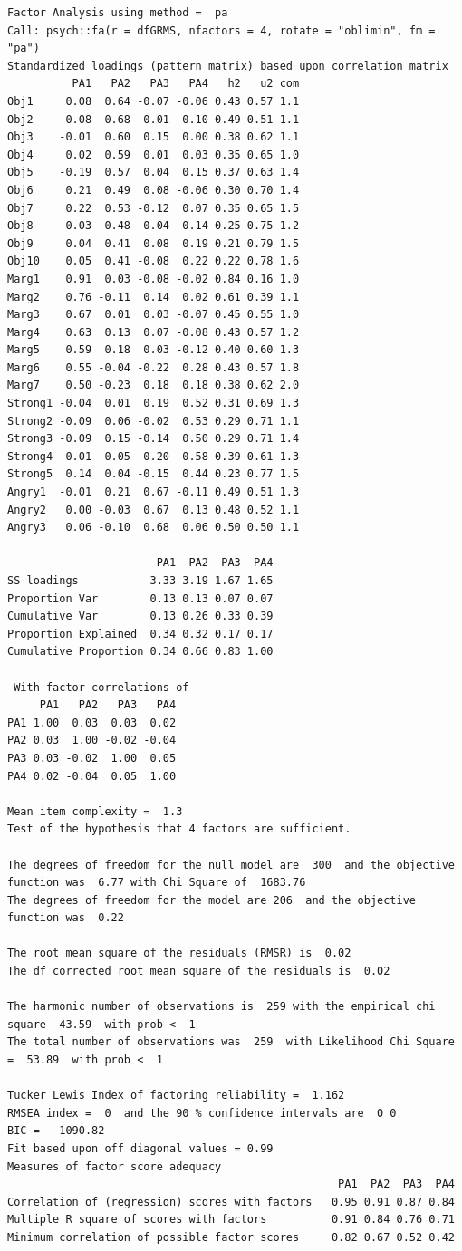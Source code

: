 \documentclass[
  english,
]{book}
\begin{document}
\begin{verbatim}
Factor Analysis using method =  pa
Call: psych::fa(r = dfGRMS, nfactors = 4, rotate = "oblimin", fm = "pa")
Standardized loadings (pattern matrix) based upon correlation matrix
          PA1   PA2   PA3   PA4   h2   u2 com
Obj1     0.08  0.64 -0.07 -0.06 0.43 0.57 1.1
Obj2    -0.08  0.68  0.01 -0.10 0.49 0.51 1.1
Obj3    -0.01  0.60  0.15  0.00 0.38 0.62 1.1
Obj4     0.02  0.59  0.01  0.03 0.35 0.65 1.0
Obj5    -0.19  0.57  0.04  0.15 0.37 0.63 1.4
Obj6     0.21  0.49  0.08 -0.06 0.30 0.70 1.4
Obj7     0.22  0.53 -0.12  0.07 0.35 0.65 1.5
Obj8    -0.03  0.48 -0.04  0.14 0.25 0.75 1.2
Obj9     0.04  0.41  0.08  0.19 0.21 0.79 1.5
Obj10    0.05  0.41 -0.08  0.22 0.22 0.78 1.6
Marg1    0.91  0.03 -0.08 -0.02 0.84 0.16 1.0
Marg2    0.76 -0.11  0.14  0.02 0.61 0.39 1.1
Marg3    0.67  0.01  0.03 -0.07 0.45 0.55 1.0
Marg4    0.63  0.13  0.07 -0.08 0.43 0.57 1.2
Marg5    0.59  0.18  0.03 -0.12 0.40 0.60 1.3
Marg6    0.55 -0.04 -0.22  0.28 0.43 0.57 1.8
Marg7    0.50 -0.23  0.18  0.18 0.38 0.62 2.0
Strong1 -0.04  0.01  0.19  0.52 0.31 0.69 1.3
Strong2 -0.09  0.06 -0.02  0.53 0.29 0.71 1.1
Strong3 -0.09  0.15 -0.14  0.50 0.29 0.71 1.4
Strong4 -0.01 -0.05  0.20  0.58 0.39 0.61 1.3
Strong5  0.14  0.04 -0.15  0.44 0.23 0.77 1.5
Angry1  -0.01  0.21  0.67 -0.11 0.49 0.51 1.3
Angry2   0.00 -0.03  0.67  0.13 0.48 0.52 1.1
Angry3   0.06 -0.10  0.68  0.06 0.50 0.50 1.1

                       PA1  PA2  PA3  PA4
SS loadings           3.33 3.19 1.67 1.65
Proportion Var        0.13 0.13 0.07 0.07
Cumulative Var        0.13 0.26 0.33 0.39
Proportion Explained  0.34 0.32 0.17 0.17
Cumulative Proportion 0.34 0.66 0.83 1.00

 With factor correlations of 
     PA1   PA2   PA3   PA4
PA1 1.00  0.03  0.03  0.02
PA2 0.03  1.00 -0.02 -0.04
PA3 0.03 -0.02  1.00  0.05
PA4 0.02 -0.04  0.05  1.00

Mean item complexity =  1.3
Test of the hypothesis that 4 factors are sufficient.

The degrees of freedom for the null model are  300  and the objective function was  6.77 with Chi Square of  1683.76
The degrees of freedom for the model are 206  and the objective function was  0.22 

The root mean square of the residuals (RMSR) is  0.02 
The df corrected root mean square of the residuals is  0.02 

The harmonic number of observations is  259 with the empirical chi square  43.59  with prob <  1 
The total number of observations was  259  with Likelihood Chi Square =  53.89  with prob <  1 

Tucker Lewis Index of factoring reliability =  1.162
RMSEA index =  0  and the 90 % confidence intervals are  0 0
BIC =  -1090.82
Fit based upon off diagonal values = 0.99
Measures of factor score adequacy             
                                                   PA1  PA2  PA3  PA4
Correlation of (regression) scores with factors   0.95 0.91 0.87 0.84
Multiple R square of scores with factors          0.91 0.84 0.76 0.71
Minimum correlation of possible factor scores     0.82 0.67 0.52 0.42
\end{verbatim}
\end{document}
